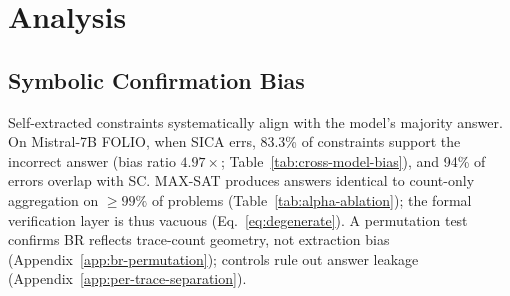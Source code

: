 \section{Analysis}
\label{sec:analysis}

\subsection{Symbolic Confirmation Bias}
\label{sec:confirmation-bias}

 Self-extracted constraints systematically align with the model's majority answer. On Mistral-7B FOLIO, when SICA errs, 83.3\% of constraints support the incorrect answer (bias ratio $4.97\times$; Table~\ref{tab:cross-model-bias}), and 94\% of errors overlap with SC. MAX-SAT produces answers identical to count-only aggregation on ${\geq}99\%$ of problems (Table~\ref{tab:alpha-ablation}); the formal verification layer is thus vacuous (Eq.~\ref{eq:degenerate}). A permutation test confirms BR reflects trace-count geometry, not extraction bias (Appendix~\ref{app:br-permutation}); controls rule out answer leakage (Appendix~\ref{app:per-trace-separation}).

\begin{table}[t]
\centering
\small
\caption{Symbolic confirmation bias across nine models on FOLIO ($n{=}204$). BR: mean per-problem bias ratio. All models exhibit $\text{BR} > 1$. Ext.: $^a$self-extraction; $^b$cross-model (Mistral-7B extracts FOL from target traces). $^*$Interim ($n{=}95$). $^\dagger$$n{=}196$ (8 API failures excluded). $^\ddagger$$n{=}161$ (43 API failures excluded).}
\label{tab:frontier-scb}
\end{table}

